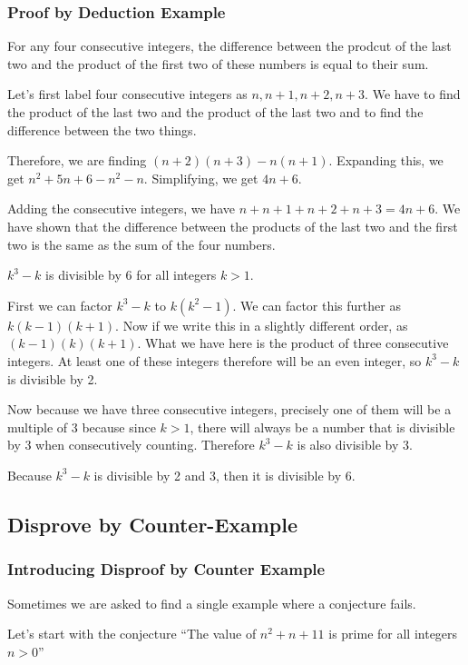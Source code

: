 \documentclass[../maths.tex]{subfiles}
\begin{document}
\subsubsection*{Proof by Deduction Example}
\begin{example}
    For any four consecutive integers, the difference between the prodcut of the last two and the product of the first two of these numbers is equal to their sum.

    Let's first label four consecutive integers as $n, n+1, n+2, n+3$. We have to find the product of the last two and the product of the last two and to find the difference between the two things.

    Therefore, we are finding $(n+2)(n+3)-n(n+1)$. Expanding this, we get $n^2+5n+6-n^2-n$. Simplifying, we get $4n+6$. 

    Adding the consecutive integers, we have $n+n+1+n+2+n+3=4n+6$. We have shown that the difference between the products of the last two and the first two is the same as the sum of the four numbers.
\end{example}
\pagebreak
\begin{example}
    $k^3-k$ is divisible by 6 for all integers $k>1$.

    First we can factor $k^3-k$ to $k(k^2-1)$. We can factor this further as $k(k-1)(k+1)$. Now if we write this in a slightly different order, as $(k-1)(k)(k+1)$. What we have here is the product of three consecutive integers. At least one of these integers therefore will be an even integer, so $k^3-k$ is divisible by 2.

    Now because we have three consecutive integers, precisely one of them will be a multiple of 3 because since $k>1$, there will always be a number that is divisible by 3 when consecutively counting. Therefore $k^3-k$ is also divisible by 3.

    Because $k^3-k$ is divisible by 2 and 3, then it is divisible by 6.
\end{example}
\subsection*{Disprove by Counter-Example}
\subsubsection*{Introducing Disproof by Counter Example}
Sometimes we are asked to find a single example where a conjecture fails.

Let's start with the conjecture ``The value of $n^2+n+11$ is prime for all integers $n>0$''
\end{document}
